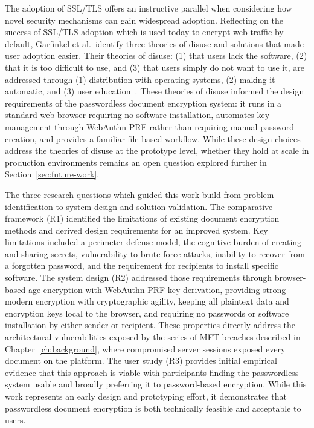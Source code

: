 The adoption of SSL/TLS offers an instructive parallel when considering how novel security mechanisms can gain widespread adoption. Reflecting on the success of SSL/TLS adoption which is used today to encrypt web traffic by default, Garfinkel et al.\ identify three theories of disuse and solutions that made user adoption easier. Their theories of disuse: (1) that users lack the software, (2) that it is too difficult to use, and (3) that users simply do not want to use it, are addressed through (1) distribution with operating systems, (2) making it automatic, and (3) user education~\cite{garfinkel_email_2005}. These theories of disuse informed the design requirements of the passwordless document encryption system: it runs in a standard web browser requiring no software installation, automates key management through WebAuthn PRF rather than requiring manual password creation, and provides a familiar file-based workflow. While these design choices address the theories of disuse at the prototype level, whether they hold at scale in production environments remains an open question explored further in Section~\ref{sec:future-work}.

The three research questions which guided this work build from problem identification to system design and solution validation. The comparative framework (R1) identified the limitations of existing document encryption methods and derived design requirements for an improved system. Key limitations included a perimeter defense model, the cognitive burden of creating and sharing secrets, vulnerability to brute-force attacks, inability to recover from a forgotten password, and the requirement for recipients to install specific software. The system design (R2) addressed those requirements through browser-based age encryption with WebAuthn PRF key derivation, providing strong modern encryption with cryptographic agility, keeping all plaintext data and encryption keys local to the browser, and requiring no passwords or software installation by either sender or recipient. These properties directly address the architectural vulnerabilities exposed by the series of MFT breaches described in Chapter~\ref{ch:background}, where compromised server sessions exposed every document on the platform. The user study (R3) provides initial empirical evidence that this approach is viable with participants finding the passwordless system usable and broadly preferring it to password-based encryption. While this work represents an early design and prototyping effort, it demonstrates that passwordless document encryption is both technically feasible and acceptable to users.

